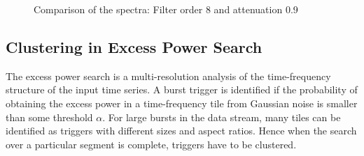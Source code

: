 \documentclass{article}
\begin{document}
\begin{figure}
\caption{Comparison of the spectra: Filter order 8 and attenuation 0.9}
\label{fig:testattenuation8_9}
\end{figure}


\subsection{Clustering in Excess Power Search}


%
%

The excess power search is a multi-resolution analysis of the
time-frequency structure of the input time series.  A burst trigger is
identified if the probability of obtaining the excess power in a
time-frequency tile from Gaussian noise is smaller than some threshold
$\alpha$.   For large bursts in the data stream, many tiles can be
identified as triggers with different sizes and aspect ratios.   Hence when
the search over a particular segment is complete,   triggers have to be
clustered. 
\end{document}
